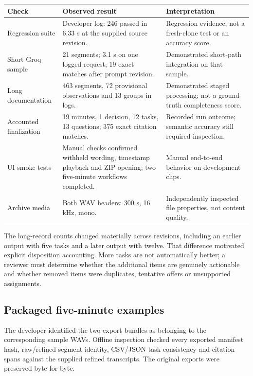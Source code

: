 \documentclass[11pt,a4paper]{article}
\begin{document}
\begin{tabularx}{\textwidth}{@{}p{}YY@{}}\toprule
Check & Observed result & Interpretation\\\midrule
Regression suite & Developer log: 246 passed in 6.33 s at the supplied source revision. & Regression evidence; not a fresh-clone test or an accuracy score.\\
Short Groq sample & 21 segments; 3.1 s on one logged request; 19 exact matches after prompt revision. & Demonstrated short-path integration on that sample.\\
Long documentation & 463 segments, 72 provisional observations and 13 groups in logs. & Demonstrated staged processing; not a ground-truth completeness score.\\
Accounted finalization & 19 minutes, 1 decision, 12 tasks, 13 questions; 375 exact citation matches. & Recorded run outcome; semantic accuracy still required inspection.\\
UI smoke tests & Manual checks confirmed withheld wording, timestamp playback and ZIP opening; two five-minute workflows completed. & Manual end-to-end behavior on development clips.\\
Archive media & Both WAV headers: 300 s, 16 kHz, mono. & Independently inspected file properties, not content quality.\\\bottomrule
\end{tabularx}

The long-record counts changed materially across revisions, including an earlier output with five tasks and a later output with twelve. That difference motivated explicit disposition accounting. More tasks are not automatically better; a reviewer must determine whether the additional items are genuinely actionable and whether removed items were duplicates, tentative offers or unsupported assignments.

\subsection{Packaged five-minute examples}
The developer identified the two export bundles as belonging to the corresponding sample WAVs. Offline inspection checked every exported manifest hash, raw/refined segment identity, CSV/JSON task consistency and citation spans against the supplied refined transcripts. The original exports were preserved byte for byte.
\end{document}
